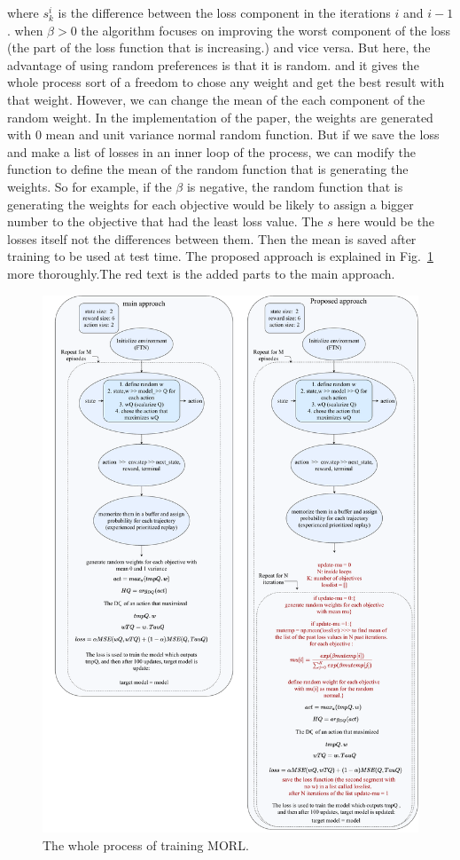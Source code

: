\documentclass[11pt,onecolumn]{IEEEtran}
\begin{document}
where $s_{k}^{i}$ is the difference between the loss component in the iterations $i$ and $i-1$. when $\beta>0$ the algorithm focuses on improving the worst component of the loss (the part of the loss function that is increasing.) and vice versa. But here, the advantage of using random preferences is that it is random. and it gives the whole process sort of a freedom to chose any weight and get the best result with that weight. However, we can change the mean of the each component of the random weight. In the implementation of the paper, the weights are generated with 0 mean and unit variance normal random function. But if we save the loss and make a list of losses in an inner loop of the process, we can modify the function to define the mean of the random function that is generating the weights. So for example, if the $\beta$ is negative, the random function that is generating the weights for each objective would be likely to assign a bigger number to the objective that had the least loss value. The $s$ here would be the losses itself not the differences between them. Then the mean is saved after training to be used at test time. The proposed approach is explained in Fig.~\ref{fig:proposed} more thoroughly.The red text is the added parts to the main approach.

\begin{figure}[htbp]
    \centering
    \includegraphics[width=0.9\linewidth]{proposed.pdf}
    \caption{The whole process of training MORL.}
    \label{fig:proposed}
\end{figure}
\end{document}
